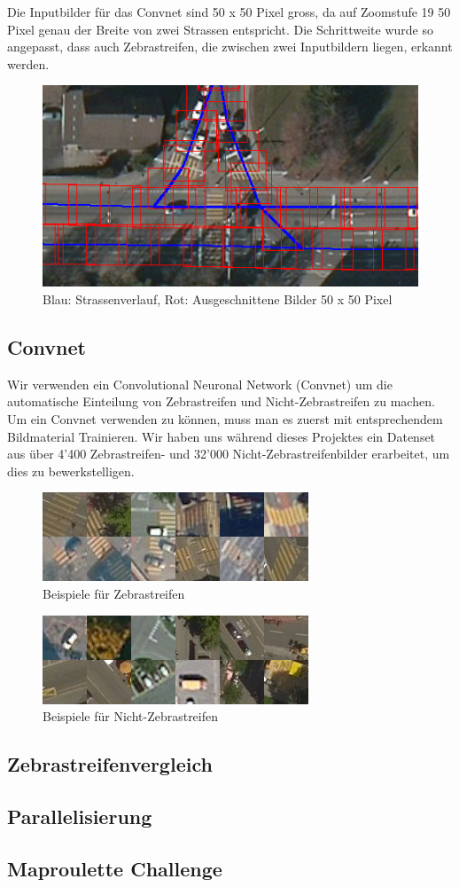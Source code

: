 Die Inputbilder für das Convnet sind 50 x 50 Pixel gross, da auf Zoomstufe 19 50 Pixel genau der Breite von zwei Strassen entspricht. Die Schrittweite wurde so angepasst, dass auch Zebrastreifen, die zwischen zwei Inputbildern liegen, erkannt werden.

\begin{figure}[H]
	\centering
	\includegraphics{images/squared_images.png}
	\caption{Blau: Strassenverlauf, Rot: Ausgeschnittene Bilder 50 x 50 Pixel}
\end{figure}

\subsection{Convnet}
Wir verwenden ein Convolutional Neuronal Network (Convnet) um die automatische Einteilung von Zebrastreifen und Nicht-Zebrastreifen zu machen. Um ein Convnet verwenden zu können, muss man es zuerst mit entsprechendem Bildmaterial Trainieren. Wir haben uns während dieses Projektes ein Datenset aus über 4'400 Zebrastreifen- und 32'000 Nicht-Zebrastreifenbilder erarbeitet, um dies zu bewerkstelligen.

\begin{figure}[H]
	\centering
	\includegraphics{images/Zebrastreifen_examples.png}
	\caption{Beispiele für Zebrastreifen}
\end{figure}
\begin{figure}[H]
	\centering
	\includegraphics{images/No_Zebrastreifen_examples.png}
	\caption{Beispiele für Nicht-Zebrastreifen}
\end{figure}







\subsection{Zebrastreifenvergleich}
\subsection{Parallelisierung}
\subsection{Maproulette Challenge}
